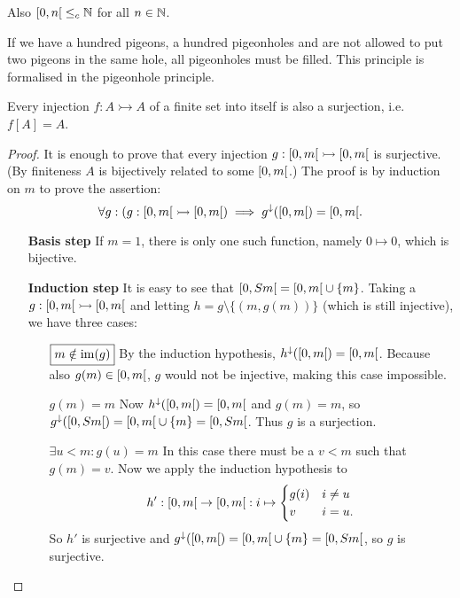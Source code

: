 Also $\interval[co]{0,n} \leq_c \N$ for all $n\in \mathbb{N}$.

If we have a hundred pigeons, a hundred pigeonholes and are not allowed to put two pigeons in the same hole, all pigeonholes must be filled. This principle is formalised in the pigeonhole principle.
\begin{theorem} \label{pigeonholePrinciple}
Every injection $f:A\rightarrowtail A$ of a finite set into itself is also a surjection, i.e.\ $f[A] = A$.
\end{theorem}
\begin{proof}
It is enough to prove that every injection $g: \interval[co]{0,m} \inj \interval[co]{0,m}$ is surjective. (By finiteness $A$ is bijectively related to some $\interval[co]{0,m}$.)
The proof is by induction on $m$ to prove the assertion:
\[ \forall g: \left(g: \interval[co]{0,m} \rightarrowtail \interval[co]{0,m}\right) \implies g^{\imf}(\interval[co]{0,m}) = \interval[co]{0,m}. \]
\begin{itemize}[leftmargin=2.5cm]
\item[\textbf{Basis step}] If $m=1$, there is only one such function, namely $0\mapsto 0$, which is bijective.
\item[\textbf{Induction step}] It is easy to see that $\interval[co]{0,Sm} = \interval[co]{0,m}\cup \{m\}$. Taking a $g: \interval[co]{0,m} \rightarrowtail \interval[co]{0,m}$ and letting $h = g\setminus \{(m,g(m))\}$ (which is still injective), we have three cases:
\begin{itemize}[leftmargin=2cm]
\item[$\boxed{m\notin \operatorname{im}(g)}$] By the induction hypothesis, $h^\imf(\interval[co]{0,m}) = \interval[co]{0,m}$. Because also $g(m)\in \interval[co]{0,m}$, $g$ would not be injective, making this case impossible.
\item[$\boxed{g(m) = m}$] Now $h^\imf(\interval[co]{0,m}) = \interval[co]{0,m}$ and $g(m)=m$, so $g^\imf(\interval[co]{0,Sm}) = \interval[co]{0,m}\cup \{m\} = \interval[co]{0,Sm}$. Thus $g$ is a surjection.
\item[$\boxed{\exists u<m: g(u) = m}$] In this case there must be a $v<m$ such that $g(m) = v$. Now we apply the induction hypothesis to
\[ h': \interval[co]{0,m} \to \interval[co]{0,m}: i\mapsto \begin{cases}
g(i) & i\neq u \\
v & i=u.
\end{cases} \]
So $h'$ is surjective and $g^{\imf}(\interval[co]{0,m}) = \interval[co]{0,m}\cup \{m\} = \interval[co]{0,Sm}$, so $g$ is surjective.
\end{itemize}
\end{itemize}
\end{proof}
